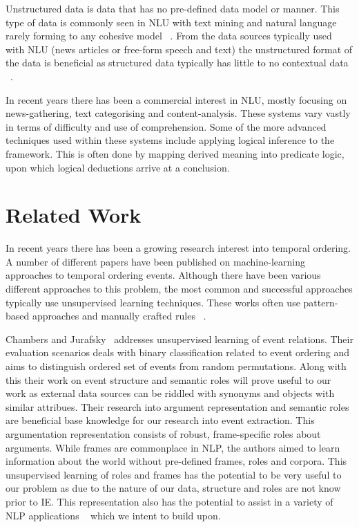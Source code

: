\documentclass[bsc,frontabs,twoside,singlespacing,parskip,deptreport]{infthesis}     %
\begin{document}
Unstructured data is data that has no pre-defined data model or manner. This type of data is
commonly seen in NLU with text mining and natural language rarely forming to any cohesive model ~\cite{feldman2007text}.
From the data sources typically used with NLU (news articles or free-form speech and text) the unstructured format of
the data is beneficial as structured data typically has little to no contextual data ~\cite{feldman2007text}.

In recent years there has been a commercial interest in NLU, mostly focusing on news-gathering, text categorising and
content-analysis. These systems vary vastly in terms of difficulty and use of comprehension. Some of the more
advanced techniques used within these systems include applying logical inference to the framework. This is often done
by mapping derived meaning into predicate logic, upon which logical deductions arrive at a conclusion.


\section{Related Work}
In recent years there has been a growing research interest into temporal ordering.
A number of different papers have been published on machine-learning approaches to temporal ordering events.
Although there have been various different approaches to this problem, the most common and successful approaches typically
use unsupervised learning techniques. These works often use pattern-based approaches and manually crafted rules ~\cite{chklovski2004mining}.  

Chambers and Jurafsky~\cite{chambers2009unsupervised} addresses unsupervised learning of event relations. Their evaluation
scenarios deals with binary classification related to event ordering and aims to distinguish ordered set
of events from random permutations. Along with this their work on event structure and semantic roles will prove useful
to our work as external data sources can be riddled with synonyms and objects with similar attribues.
Their research into argument representation and semantic roles are beneficial base
knowledge for our research into event extraction.
This argumentation representation consists of robust,
frame-specific roles about arguments. While frames are commonplace in NLP, the authors aimed to learn information
about the world without pre-defined frames, roles and corpora. This unsupervised learning of roles and frames has the
potential to be very useful to our problem as due to the nature of our data, structure and roles are not know prior to
IE. This representation also has the potential to assist in a variety of NLP applications ~\cite{chambers2009unsupervised} which
we intent to build upon.
\end{document}
